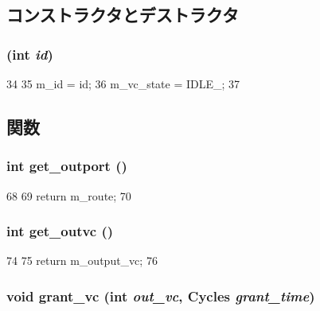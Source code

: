 \subsection{コンストラクタとデストラクタ}
\hypertarget{classInVcState_a9b5c184b8713de2f4faae10915d2931a}{
\subsubsection[{InVcState}]{ (int {\em id})}}
\label{classInVcState_a9b5c184b8713de2f4faae10915d2931a}



\begin{DoxyCode}
34 {
35     m_id = id;
36     m_vc_state = IDLE_;
37 }
\end{DoxyCode}


\subsection{関数}
\hypertarget{classInVcState_a47a477d5bcd6a5d32aa4028e103f06ca}{
\subsubsection[{get\_\-outport}]{\setlength{\rightskip}{0pt plus 5cm}int get\_\-outport ()}}
\label{classInVcState_a47a477d5bcd6a5d32aa4028e103f06ca}



\begin{DoxyCode}
68 {
69     return m_route;
70 }
\end{DoxyCode}
\hypertarget{classInVcState_a24b86446f92393208caa8f73c96d121f}{
\subsubsection[{get\_\-outvc}]{\setlength{\rightskip}{0pt plus 5cm}int get\_\-outvc ()}}
\label{classInVcState_a24b86446f92393208caa8f73c96d121f}



\begin{DoxyCode}
74 {
75     return m_output_vc;
76 }
\end{DoxyCode}
\hypertarget{classInVcState_a2345abcd6b8dd8d45bc24b3576bdbb62}{
\subsubsection[{grant\_\-vc}]{\setlength{\rightskip}{0pt plus 5cm}void grant\_\-vc (int {\em out\_\-vc}, \/  {\bf Cycles} {\em grant\_\-time})}}
\label{classInVcState_a2345abcd6b8dd8d45bc24b3576bdbb62}



